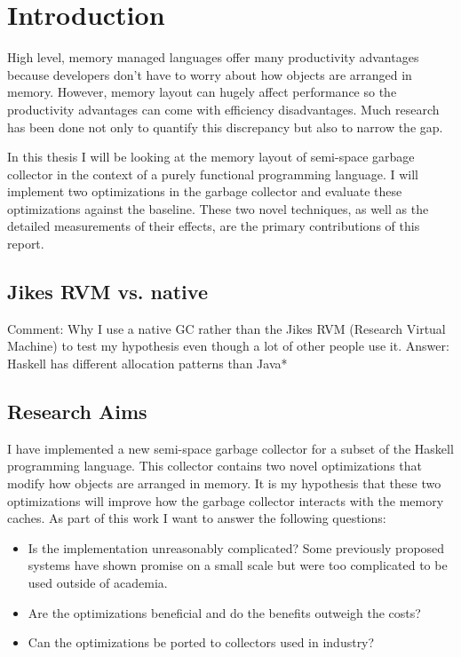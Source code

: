 \documentclass[a4paper,oneside]{memoir}
\newcommand{\makecomment}[1]{{\color{red} Comment: #1}}
\begin{document}
\newpage

\tableofcontents*

\chapter{Introduction}
High level, memory managed languages offer many productivity advantages because
developers don't have to worry about how objects are arranged in memory. However,
memory layout can hugely affect performance so the productivity advantages can
come with efficiency disadvantages. Much research has been done not only to
quantify this discrepancy but also to narrow the gap.

In this thesis I will be looking at the memory layout of semi-space garbage
collector in the context of a purely functional programming language.
I will implement two optimizations in the garbage collector and evaluate these
optimizations against the baseline. These two novel techniques, as well as the
detailed measurements of their effects, are the primary contributions of this
report.

\section{Jikes RVM vs. native}
\makecomment{Why I use a native GC rather than the Jikes RVM (Research Virtual Machine)
to test my hypothesis even though a lot of other people use it.
Answer: Haskell has different allocation patterns than Java*}

\section{Research Aims}
I have implemented a new semi-space garbage collector for a subset of the
Haskell programming language. This collector contains two novel optimizations
that modify how objects are arranged in memory. It is my hypothesis that these
two optimizations will improve how the garbage collector interacts with the
memory caches. As part of this work I want to answer the following questions:
\begin{itemize}
  \item Is the implementation unreasonably complicated? Some previously proposed
    systems have shown promise on a small scale but were too complicated to be
    used outside of academia.
  \item Are the optimizations beneficial and do the benefits outweigh the costs?
  \item Can the optimizations be ported to collectors used in industry?
\end{itemize}
\end{document}
